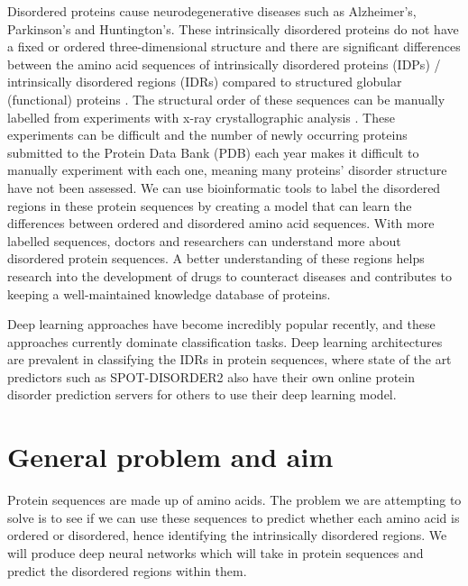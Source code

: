 \documentclass{l4proj}
\begin{document}
Disordered proteins cause neurodegenerative diseases such as Alzheimer’s, Parkinson’s and Huntington’s. These intrinsically disordered proteins do not have a fixed or ordered three-dimensional structure and there are significant differences between the amino acid sequences of intrinsically disordered proteins (IDPs) / intrinsically disordered regions (IDRs) compared to structured globular (functional) proteins \citep{disordered_proteins_diseases_paper}. The structural order of these sequences can be manually labelled from experiments with x-ray crystallographic analysis \citep{idp_wiki}. These experiments can be difficult and the number of newly occurring proteins submitted to the Protein Data Bank (PDB) \citep{pdb} each year makes it difficult to manually experiment with each one, meaning many proteins’ disorder structure have not been assessed. We can use bioinformatic tools to label the disordered regions in these protein sequences by creating a model that can learn the differences between ordered and disordered amino acid sequences. With more labelled sequences, doctors and researchers can understand more about disordered protein sequences. A better understanding of these regions helps research into the development of drugs to counteract diseases and contributes to keeping a well-maintained knowledge database of proteins.  

Deep learning approaches have become incredibly popular recently, and these approaches currently dominate classification tasks. Deep learning architectures are prevalent in classifying the IDRs in protein sequences, where state of the art predictors such as SPOT-DISORDER2 \citep{spot_disorder_2} also have their own online protein disorder prediction servers for others to use their deep learning model.

\section{General problem and aim}

Protein sequences are made up of amino acids. The problem we are attempting to solve is to see if we can use these sequences to predict whether each amino acid is ordered or disordered, hence identifying the intrinsically disordered regions. We will produce deep neural networks which will take in protein sequences and predict the disordered regions within them. 
\end{document}
